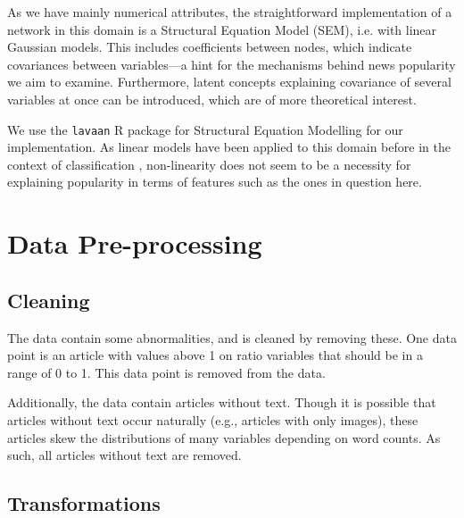 \documentclass{article}
\begin{document}
As we have mainly numerical attributes, the straightforward implementation of a network in this domain is a Structural Equation Model (SEM), i.e. with linear Gaussian models. This includes coefficients between nodes, which indicate covariances between variables---a hint for the mechanisms behind news popularity we aim to examine. Furthermore, latent concepts explaining covariance of several variables at once can be introduced, which are of more theoretical interest.

We use the \texttt{lavaan} R package for Structural Equation Modelling for our implementation.
As linear models have been applied to this domain before in the context of classification \citep{petrovic2011rt}, non-linearity does not seem to be a necessity for explaining popularity in terms of features such as the ones in question here. 

\section{Data Pre-processing}
\subsection{Cleaning}
The data contain some abnormalities, and is cleaned by removing these.
One data point is an article with values above 1 on ratio variables that should be in a range of 0 to 1.
This data point is removed from the data.

Additionally, the data contain articles without text.
Though it is possible that articles without text occur naturally (e.g., articles with only images), these articles skew the distributions of many variables depending on word counts.
As such, all articles without text are removed.

\subsection{Transformations}
\end{document}
